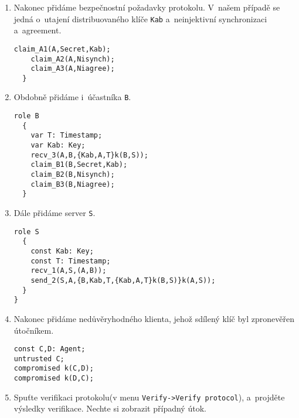 \begin{enumerate}
  \item Nakonec přidáme bezpečnostní požadavky protokolu. V~našem případě se jedná o~utajení distribuovaného klíče \texttt{Kab}
  a~neinjektivní synchronizaci a~agreement.
  \begin{lstlisting}[name=DenningSacco]
    claim_A1(A,Secret,Kab);
    claim_A2(A,Nisynch);
    claim_A3(A,Niagree);
  }
  \end{lstlisting}

  \item Obdobně přidáme i~účastníka \texttt{B}.
  \begin{lstlisting}[name=DenningSacco]
  role B
  {
    var T: Timestamp;
    var Kab: Key;
    recv_3(A,B,{Kab,A,T}k(B,S));
    claim_B1(B,Secret,Kab);
    claim_B2(B,Nisynch);
    claim_B3(B,Niagree);
  }
  \end{lstlisting}

  \item Dále přidáme server \texttt{S}.
  \begin{lstlisting}[name=DenningSacco]
  role S
  {
    const Kab: Key;
    const T: Timestamp;
    recv_1(A,S,(A,B));
    send_2(S,A,{B,Kab,T,{Kab,A,T}k(B,S)}k(A,S));
  }
}
  \end{lstlisting}

  \item Nakonec přidáme nedůvěryhodného klienta, jehož sdílený klíč byl zpronevěřen útočníkem.
  \begin{lstlisting}[name=DenningSacco]
const C,D: Agent;
untrusted C;
compromised k(C,D);
compromised k(D,C);
  \end{lstlisting}

  \item Spuťte verifikaci protokolu(v menu \texttt{Verify->Verify protocol}), a~projděte výsledky verifikace. Nechte
  si zobrazit případný útok.
\end{enumerate}